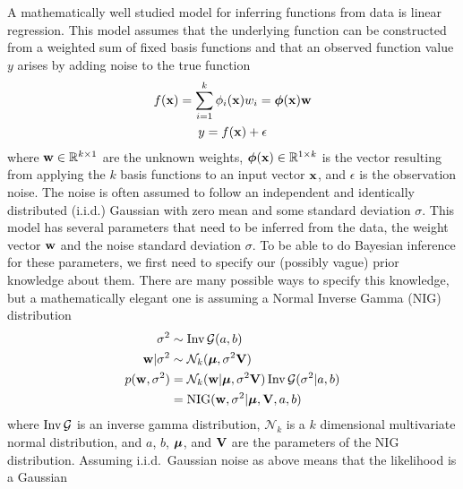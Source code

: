 \documentclass[../thesis.tex]{subfiles}
\begin{document}
A mathematically well studied model for inferring functions from data is linear regression. This model assumes that the underlying function can be constructed from a weighted sum of fixed basis functions and that an observed function value $y$ arises by adding noise to the true function
\begin{gather}
        f(\boldsymbol{\mathbf{x}}) = \sum_{i=1}^k \phi_i(\boldsymbol{\mathbf{x}}) w_i = \boldsymbol{\mathbf{\phi}}(\boldsymbol{\mathbf{x}}) \boldsymbol{\mathbf{w}} \\
        y = f(\boldsymbol{\mathbf{x}}) + \epsilon
\end{gather}
where $\boldsymbol{\mathbf{w}} \in \mathbb{R}^{k \times 1}$ are the unknown weights, $\boldsymbol{\mathbf{\phi}}(\boldsymbol{\mathbf{x}}) \in \mathbb{R}^{1 \times k}$ is the vector resulting from applying the $k$ basis functions to an input vector $\boldsymbol{\mathbf{x}}$,  and $\epsilon$ is the observation noise. The noise is often assumed to follow an independent and identically distributed (i.i.d.) Gaussian with zero mean and some standard deviation $\sigma$. This model has several parameters that need to be inferred from the data, the weight vector $\boldsymbol{\mathbf{w}}$ and the noise standard deviation $\sigma$. To be able to do Bayesian inference for these parameters, we first need to specify our (possibly vague) prior knowledge about them. There are many possible ways to specify this knowledge, but a mathematically elegant one is assuming a Normal Inverse Gamma (NIG) distribution
\begin{equation}
    \begin{split}
        \sigma^2 &\sim \operatorname{Inv}\mathcal{G}(a, b) \\  
        \boldsymbol{\mathbf{w}} | \sigma^2 &\sim \mathcal{N}_k(\boldsymbol{\mathbf{\mu}}, \sigma^2 \boldsymbol{\mathbf{V}}) \\
        p(\boldsymbol{\mathbf{w}}, \sigma^2) &= \mathcal{N}_k(\boldsymbol{\mathbf{w}} | \boldsymbol{\mathbf{\mu}}, \sigma^2 \boldsymbol{\mathbf{V}})  \operatorname{Inv}\mathcal{G}(\sigma^2 | a, b) \\
        &= \operatorname{NIG}(\boldsymbol{\mathbf{w}}, \sigma^2 | \boldsymbol{\mathbf{\mu}}, \boldsymbol{\mathbf{V}}, a, b) \\
    \end{split}
\end{equation}
where $\operatorname{Inv}\mathcal{G}$ is an inverse gamma distribution, $\mathcal{N}_k$ is a $k$ dimensional multivariate normal distribution, and $a$, $b$, $\boldsymbol{\mathbf{\mu}}$, and $\boldsymbol{\mathbf{V}}$ are the parameters of the NIG distribution. Assuming i.i.d.\ Gaussian noise as above means that the likelihood is a Gaussian
\end{document}
